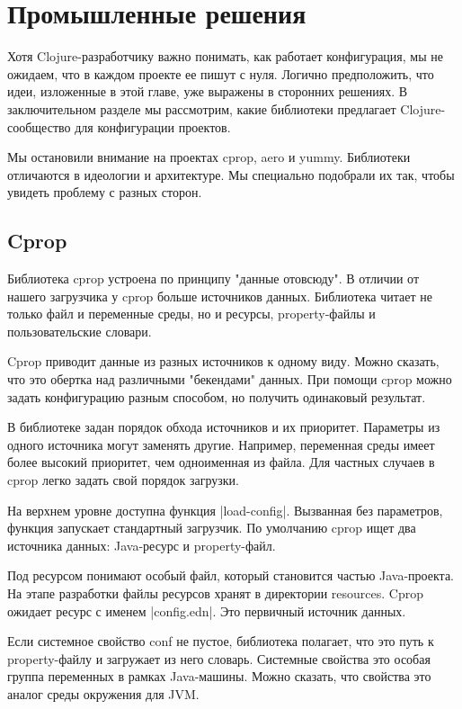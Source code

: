 \section{Промышленные решения}

Хотя Clojure-разработчику важно понимать, как работает конфигурация, мы не
ожидаем, что в каждом проекте ее пишут с нуля. Логично предположить, что идеи,
изложенные в этой главе, уже выражены в сторонних решениях. В заключительном
разделе мы рассмотрим, какие библиотеки предлагает Clojure-сообщество для
конфигурации проектов.

Мы остановили внимание на проектах cprop, aero и yummy. Библиотеки отличаются в
идеологии и архитектуре. Мы специально подобрали их так, чтобы увидеть проблему
с разных сторон.

\subsection{Cprop}

Библиотека cprop устроена по принципу "данные отовсюду". В отличии от нашего
загрузчика у cprop больше источников данных. Библиотека читает не только файл и
переменные среды, но и ресурсы, property-файлы и пользовательские словари.

Cprop приводит данные из разных источников к одному виду. Можно сказать, что это
обертка над различными "бекендами" данных. При помощи cprop можно задать
конфигурацию разным способом, но получить одинаковый результат.

В библиотеке задан порядок обхода источников и их приоритет. Параметры из одного
источника могут заменять другие. Например, переменная среды имеет более высокий
приоритет, чем одноименная из файла. Для частных случаев в cprop легко задать
свой порядок загрузки.

На верхнем уровне доступна функция \spverb|load-config|. Вызванная без параметров,
функция запускает стандартный загрузчик. По умолчанию cprop ищет два источника
данных: Java-ресурс и property-файл.

Под ресурсом понимают особый файл, который становится частью Java-проекта. На
этапе разработки файлы ресурсов хранят в директории resources. Cprop ожидает
ресурс с именем \spverb|config.edn|. Это первичный источник данных.

Если системное свойство conf не пустое, библиотека полагает, что это путь к
property-файлу и загружает из него словарь. Системные свойства это особая группа
переменных в рамках Java-машины. Можно сказать, что свойства это аналог среды
окружения для JVM.

